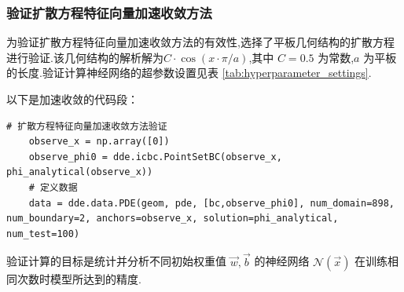 \documentclass{Sichuan Normal University}
\begin{document}


\subsubsection{验证扩散方程特征向量加速收敛方法}

为验证扩散方程特征向量加速收敛方法的有效性,选择了平板几何结构的扩散方程进行验证.该几何结构的解析解为$C\cdot\cos(x\cdot\pi/a)$,其中 $C=0.5$ 为常数,$a$ 为平板的长度.验证计算神经网络的超参数设置见表 \ref{tab:hyperparameter_settings}.

\noindent 以下是加速收敛的代码段：
\begin{lstlisting}[style=python,basicstyle=\footnotesize\fontspec{Courier New},]  
    # 扩散方程特征向量加速收敛方法验证
    observe_x = np.array([0])
    observe_phi0 = dde.icbc.PointSetBC(observe_x, phi_analytical(observe_x))
    # 定义数据
    data = dde.data.PDE(geom, pde, [bc,observe_phi0], num_domain=898, num_boundary=2, anchors=observe_x, solution=phi_analytical, num_test=100)
\end{lstlisting}
验证计算的目标是统计并分析不同初始权重值 ${\vec{w}, \vec{b}}$ 的神经网络 $\mathcal{N}(\vec{x})$ 在训练相同次数时模型所达到的精度.
\end{document}
